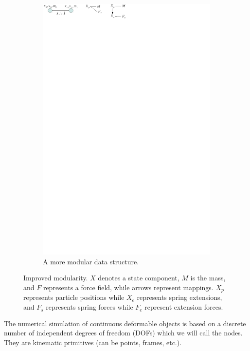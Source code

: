 \begin{figure}
\begin{subfigure}[t]{0.3\linewidth}
   \includegraphics[clip,trim=80mm 280mm 100mm 0mm]{mass-spring.pdf}
   \caption{A more modular data structure.} \label{fig mass-spring-flexible}
 \end{subfigure}
 \caption{Improved modularity. $X$ denotes a state component, $M$ is the mass, and $F$ represents a force field, while arrows represent mappings. $X_p$ represents particle positions while $X_e$ represents spring extensions, and $F_s$ represents spring forces while $F_e$ represent extension forces.}
 \label{fig modularity mass-spring}
\end{figure}


The numerical simulation of continuous deformable objects is based on a discrete number of independent degrees of freedom (DOFs) which we will call the nodes. They are kinematic primitives (can be points, frames, etc.).

